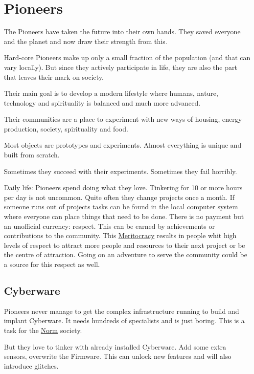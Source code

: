 \section{Pioneers}

The Pioneers have taken the future into their own hands. They saved everyone and the planet and now draw their strength from this.

Hard-core Pioneers make up only a small fraction of the population (and that can vary locally). But since they actively participate in life, they are also the part that leaves their mark on society.

Their main goal is to develop a modern lifestyle where humans, nature, technology and spirituality is balanced and much more advanced.

Their communities are a place to experiment with new ways of housing, energy production, society, spirituality and food.

Most objects are prototypes and experiments. Almost everything is unique and built from scratch.

Sometimes they succeed with their experiments. Sometimes they fail horribly.


Daily life: Pioneers spend doing what they love. Tinkering for 10 or more hours per day is not uncommon. Quite often they change projects once a month. If someone runs out of projects tasks can be found in the local computer system where everyone can place things that need to be done. There is no payment but an unofficial currency: respect. This can be earned by achievements or contributions to the community. This \hyperref[sec:meritocracy]{Meritocracy} results in people whit high levels of respect to attract more people and resources to their next project or be the centre of attraction.
Going on an adventure to serve the community could be a source for this respect as well.

\subsection{Cyberware}
\label{sec:Cyberware Pioneers}

Pioneers never manage to get the complex infrastructure running to build and implant Cyberware. It needs hundreds of specialists and is just boring. This is a task for the \hyperref[sec:Cyberware Norm]{Norm} society.

But they love to tinker with already installed Cyberware. Add some extra sensors, overwrite the Firmware. This can unlock new features and will also introduce glitches.


